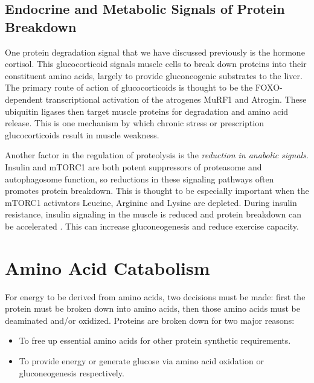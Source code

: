 \documentclass{tufte-handout}
\begin{document}
\subsection{Endocrine and Metabolic Signals of Protein Breakdown}

One protein degradation signal that we have discussed previously is the hormone cortisol.  This glucocorticoid signals muscle cells to break down proteins into their constituent amino acids, largely to provide gluconeogenic substrates to the liver.  The primary route of action of glucocorticoids is thought to be the FOXO-dependent transcriptional activation of the atrogenes MuRF1 and Atrogin.  These ubiquitin ligases then target muscle proteins for degradation and amino acid release.  This is one mechanism by which chronic stress or prescription glucocorticoids result in muscle weakness.

Another factor in the regulation of proteolysis is the \emph{reduction in anabolic signals}.  Insulin and mTORC1 are both potent suppressors of proteasome and autophagosome function, so reductions in these signaling pathways often promotes protein breakdown.  This is thought to be especially important when the mTORC1 activators Leucine, Arginine and Lysine are depleted.  During insulin resistance, insulin signaling in the muscle is reduced and protein breakdown can be accelerated \citep{Wang2006b}.  This can increase gluconeogenesis and reduce exercise capacity.

\section{Amino Acid Catabolism}

For energy to be derived from amino acids, two decisions must be made: first the protein must be broken down into amino acids, then those amino acids must be deaminated and/or oxidized. Proteins are broken down for two major reasons:

\begin{itemize}
\item To free up essential amino acids for other protein synthetic requirements.
\item To provide energy or generate glucose via amino acid oxidation or gluconeogenesis respectively.
\end{itemize}	
\end{document}
